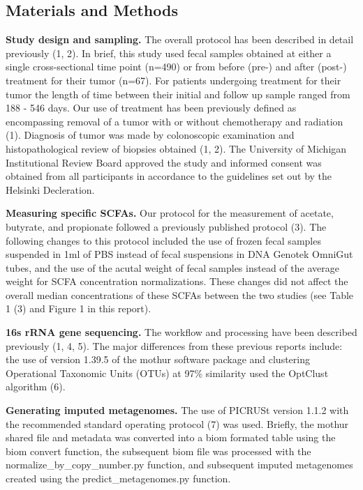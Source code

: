 \documentclass[11pt,]{article}
\begin{document}
\newpage

\subsection{Materials and Methods}\label{materials-and-methods}

\textbf{Study design and sampling.} The overall protocol has been
described in detail previously (1, 2). In brief, this study used fecal
samples obtained at either a single cross-sectional time point (n=490)
or from before (pre-) and after (post-) treatment for their tumor
(n=67). For patients undergoing treatment for their tumor the length of
time between their initial and follow up sample ranged from 188 - 546
days. Our use of treatment has been previously defined as encompassing
removal of a tumor with or without chemotherapy and radiation (1).
Diagnosis of tumor was made by colonoscopic examination and
histopathological review of biopsies obtained (1, 2). The University of
Michigan Institutional Review Board approved the study and informed
consent was obtained from all participants in accordance to the
guidelines set out by the Helsinki Decleration.

\textbf{Measuring specific SCFAs.} Our protocol for the measurement of
acetate, butyrate, and propionate followed a previously published
protocol (3). The following changes to this protocol included the use of
frozen fecal samples suspended in 1ml of PBS instead of fecal
suspensions in DNA Genotek OmniGut tubes, and the use of the acutal
weight of fecal samples instead of the average weight for SCFA
concentration normalizations. These changes did not affect the overall
median concentrations of these SCFAs between the two studies (see Table
1 (3) and Figure 1 in this report).

\textbf{16s rRNA gene sequencing.} The workflow and processing have been
described previously (1, 4, 5). The major differences from these
previous reports include: the use of version 1.39.5 of the mothur
software package and clustering Operational Taxonomic Units (OTUs) at
97\% similarity used the OptClust algorithm (6).

\textbf{Generating imputed metagenomes.} The use of PICRUSt version
1.1.2 with the recommended standard operating protocol (7) was used.
Briefly, the mothur shared file and metadata was converted into a biom
formated table using the biom convert function, the subsequent biom file
was processed with the normalize\_by\_copy\_number.py function, and
subsequent imputed metagenomes created using the predict\_metagenomes.py
function.
\end{document}
